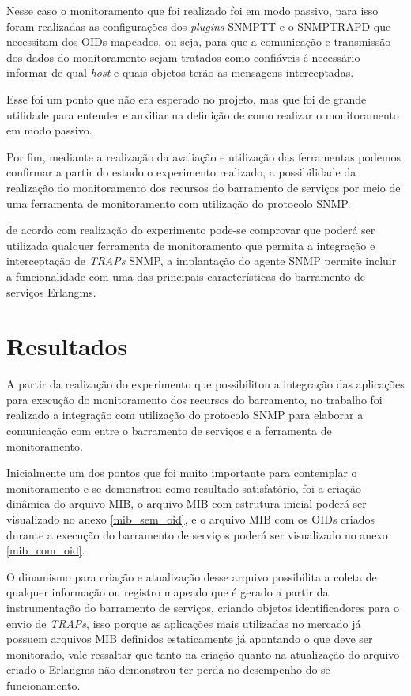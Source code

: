 Nesse caso o monitoramento que foi realizado foi em modo passivo, para isso foram realizadas as configurações dos \textit{plugins} \acrshort{SNMPTT} e o SNMPTRAPD que necessitam dos \acrshort{OID}s mapeados, ou seja, para que a comunicação e transmissão dos dados do monitoramento sejam tratados como confiáveis é necessário informar de qual \textit{host} e quais objetos terão as mensagens interceptadas.

Esse foi um ponto que não era esperado no projeto, mas que foi de grande utilidade para entender e auxiliar na definição de como realizar o monitoramento em modo passivo.   

Por fim, mediante a realização da avaliação e utilização das ferramentas podemos confirmar a partir do estudo o experimento realizado, a possibilidade da realização do monitoramento dos recursos do barramento de serviços por meio de uma ferramenta de monitoramento com utilização do protocolo \acrshort{SNMP}. 

de acordo com realização do experimento pode-se comprovar que poderá ser utilizada qualquer ferramenta de monitoramento que permita a integração e interceptação de \textit{TRAPs} \acrshort{SNMP}, a implantação do agente \acrshort{SNMP} permite incluir a funcionalidade com uma das principais características do barramento de serviços Erlangms.   



\section{Resultados}
\label{resultados}

A partir da realização do experimento que possibilitou a integração das aplicações para execução do monitoramento dos recursos do barramento, no trabalho foi realizado a integração com utilização do protocolo \acrshort{SNMP} para elaborar a comunicação com entre o barramento de serviços e a ferramenta de monitoramento. 

Inicialmente um dos pontos que foi muito importante para contemplar o monitoramento e se demonstrou como resultado satisfatório, foi a criação dinâmica do arquivo MIB, o arquivo MIB com estrutura inicial poderá ser visualizado no anexo \ref{mib_sem_oid}, e o arquivo MIB com os \acrshort{OID}s criados durante a execução do barramento de serviços poderá ser visualizado no anexo \ref{mib_com_oid}. 

O dinamismo para criação e atualização desse arquivo possibilita a coleta de qualquer informação ou registro mapeado que é gerado a partir da instrumentação do barramento de serviços, criando objetos identificadores para o envio de \textit{TRAPs}, isso porque as aplicações mais utilizadas no mercado já possuem arquivos MIB definidos estaticamente já apontando o que deve ser monitorado, vale ressaltar que tanto na criação quanto na atualização do arquivo criado o Erlangms não demonstrou ter perda no desempenho do se funcionamento.

